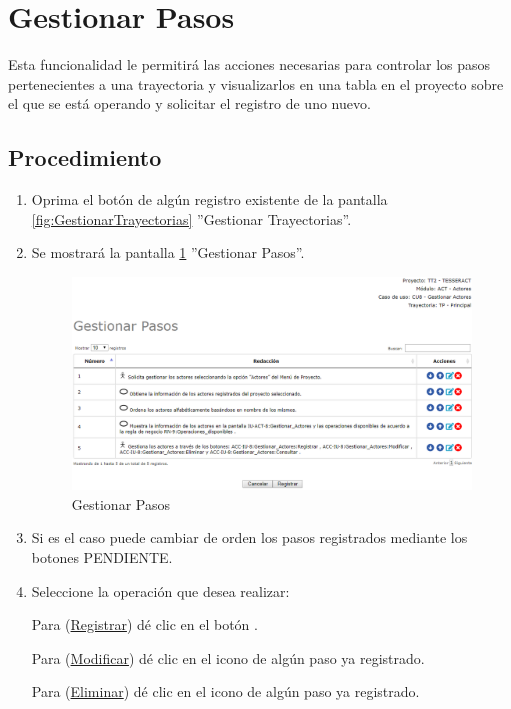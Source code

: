 \hypertarget{cv:GestionarPasos}{\section{Gestionar Pasos}} \label{sec:GestionarPasos}

	Esta funcionalidad le permitirá las acciones necesarias para controlar los pasos pertenecientes a una trayectoria y visualizarlos en una tabla en el proyecto sobre el que se está operando y solicitar el registro de uno nuevo.

		\subsection{Procedimiento}

			\begin{enumerate}
			
			\item Oprima el botón \IUPasos{} de algún registro existente de la pantalla \ref{fig:GestionarTrayectorias} ''Gestionar Trayectorias''.
	
			\item Se mostrará la pantalla \ref{fig:GestionarPasos} ''Gestionar Pasos''.

			\begin{figure}[htbp!]
				\begin{center}
					\includegraphics[scale=0.6]{roles/lider/casosUso/trayectorias/pasos/pantallas/iu6-1-1-1-1-1gestionarPasos}
					\caption{Gestionar Pasos}
					\label{fig:GestionarPasos}
				\end{center}
			\end{figure}
		
			\item Si es el caso puede cambiar de orden los pasos registrados mediante los botones PENDIENTE.
		
			\item Seleccione la operación que desea realizar:
			
			Para (\hyperlink{cv:registrarPaso}{Registrar}) dé clic en el botón \IURegistrar.
			
			Para (\hyperlink{cv:modificarPaso}{Modificar}) dé clic en el icono \IUEditar{} de algún paso ya registrado.
			
			Para (\hyperlink{cv:eliminarPaso}{Eliminar}) dé clic en el icono \IUBotonEliminar{} de algún paso ya registrado.
			
			\end{enumerate}